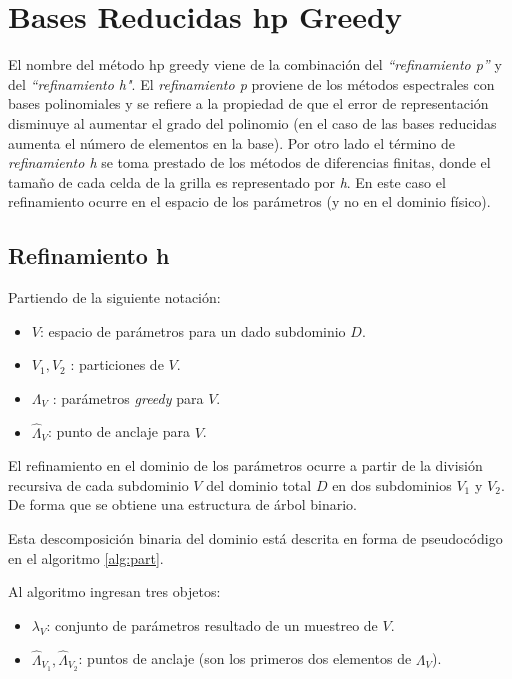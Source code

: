 \section{Bases Reducidas hp Greedy}

El nombre del método hp greedy viene de la combinación del \textit{``refinamiento p''} y del \textit{``refinamiento h"}. El \textit{refinamiento p} proviene de los métodos espectrales con bases polinomiales \cite{hesthaven_gottlieb_gottlieb_2007} y se refiere a la propiedad de que el error de representación disminuye al aumentar el grado del polinomio (en el caso de las bases reducidas aumenta el número de elementos en la base). Por otro lado el término de \textit{refinamiento h} se toma prestado de los métodos de diferencias finitas, donde el tamaño de cada celda de la grilla es representado por \textit{h}. En este caso el refinamiento ocurre en el espacio de los parámetros (y no en el dominio físico).

\subsection{Refinamiento h}

Partiendo de la siguiente notación:
\begin{itemize}
\item $V$: espacio de parámetros para un dado subdominio $D$.
\item $V_1, V_2$ : particiones de $V$.
\item $\Lambda_V$ : parámetros \textit{greedy} para $V$.
\item  $\hat{\Lambda}_{V}$: punto de anclaje para $V$.
\end{itemize}

El refinamiento en el dominio de los parámetros ocurre a partir de la división recursiva de cada subdominio $V$ del dominio total $D$ en dos subdominios $V_1$ y $V_2$. De forma que se obtiene una estructura de árbol binario.


Esta descomposición binaria del dominio está descrita en forma de pseudocódigo en el algoritmo \ref{alg:part}.

Al algoritmo ingresan tres objetos:

\begin{itemize}
\item $\lambda_V$: conjunto de parámetros resultado de un muestreo de $V$.
\item $\hat{\Lambda}_{V_1}, \hat{\Lambda}_{V_2}$: puntos de anclaje (son los primeros dos elementos de $\Lambda_V$).
\end{itemize}

